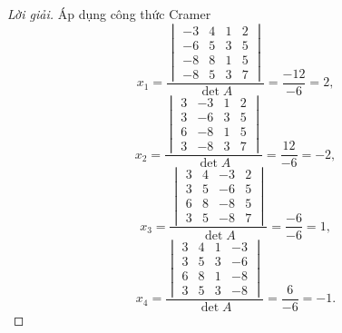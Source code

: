 \begin{proof}[Lời giải]
    Áp dụng công thức Cramer
    \[
        x_{1} = \dfrac{
            \begin{vmatrix}
                -3 & 4 & 1 & 2 \\
                -6 & 5 & 3 & 5 \\
                -8 & 8 & 1 & 5 \\
                -8 & 5 & 3 & 7
            \end{vmatrix}
        }{\det A} = \dfrac{-12}{-6} = 2,
    \]
    \[
        x_{2} = \dfrac{
            \begin{vmatrix}
                3 & -3 & 1 & 2 \\
                3 & -6 & 3 & 5 \\
                6 & -8 & 1 & 5 \\
                3 & -8 & 3 & 7
            \end{vmatrix}
        }{\det A} = \dfrac{12}{-6} = -2,
    \]
    \[
        x_{3} = \dfrac{
            \begin{vmatrix}
                3 & 4 & -3 & 2 \\
                3 & 5 & -6 & 5 \\
                6 & 8 & -8 & 5 \\
                3 & 5 & -8 & 7
            \end{vmatrix}
        }{\det A} = \dfrac{-6}{-6} = 1,
    \]
    \[
        x_{4} = \dfrac{
            \begin{vmatrix}
                3 & 4 & 1 & -3 \\
                3 & 5 & 3 & -6 \\
                6 & 8 & 1 & -8 \\
                3 & 5 & 3 & -8
            \end{vmatrix}
        }{\det A} = \dfrac{6}{-6} = -1.
    \]
    
    \bigskip
    

\end{proof}
